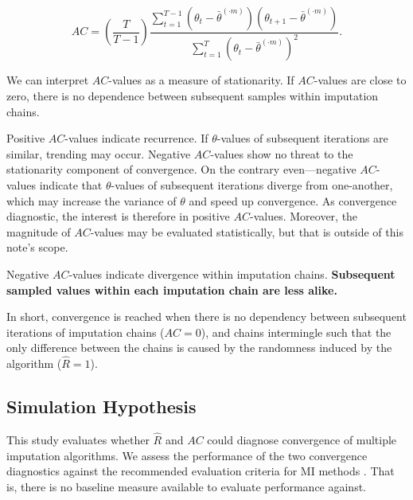 \documentclass[Royal,times,sageh]{sagej}
\begin{document}
\begin{equation*}
AC = \left( \frac{T}{T-1} \right) \frac{\sum_{t=1}^{T-1}(\theta_t - \bar{\theta}^{(\cdot m)})(\theta_{t+1} - \bar{\theta}^{(\cdot m)})}{\sum_{t=1}^{T}(\theta_t - \bar{\theta}^{(\cdot m)})^2}.
\end{equation*}

We can interpret \(AC\)-values as a measure of stationarity. If
\(AC\)-values are close to zero, there is no dependence between
subsequent samples within imputation chains.

Positive \(AC\)-values indicate recurrence. If \(\theta\)-values of
subsequent iterations are similar, trending may occur. Negative
\(AC\)-values show no threat to the stationarity component of
convergence. On the contrary even---negative \(AC\)-values indicate that
\(\theta\)-values of subsequent iterations diverge from one-another,
which may increase the variance of \(\theta\) and speed up convergence.
As convergence diagnostic, the interest is therefore in positive
\(AC\)-values. Moreover, the magnitude of \(AC\)-values may be evaluated
statistically, but that is outside of this note's scope.

Negative \(AC\)-values indicate divergence within imputation chains.
\textbf{Subsequent sampled values within each imputation chain are less
alike.}

In short, convergence is reached when there is no dependency between
subsequent iterations of imputation chains (\(AC = 0\)), and chains
intermingle such that the only difference between the chains is caused
by the randomness induced by the algorithm (\(\widehat{R} = 1\)).

\hypertarget{simulation-hypothesis}{%
\subsection{Simulation Hypothesis}\label{simulation-hypothesis}}

This study evaluates whether \(\widehat{R}\) and \(AC\) could diagnose
convergence of multiple imputation algorithms. We assess the performance
of the two convergence diagnostics against the recommended evaluation
criteria for MI methods \citep[i.e., average bias, average confidence
interval width, and empirical coverage rate across simulations;][\(\S\)
2.5.2]{buur18}. That is, there is no baseline measure available to
evaluate performance against.
\end{document}
